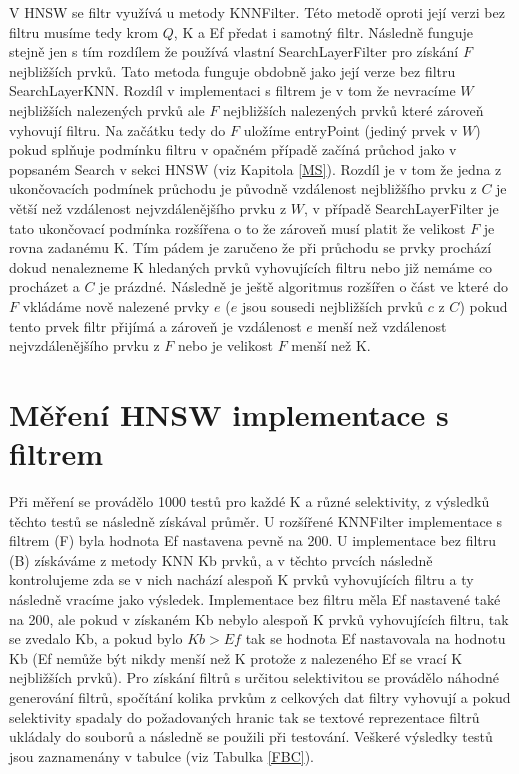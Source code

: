 \documentclass[czech,semestral,dept460,male,csharp,cpdeclaration]{diploma}
\begin{document}
		V HNSW se filtr využívá u metody KNNFilter. Této metodě oproti její verzi bez filtru musíme tedy krom $Q$, K a Ef předat i samotný filtr. Následně funguje stejně jen s tím rozdílem že používá vlastní SearchLayerFilter pro získání $F$ nejbližších prvků. Tato metoda funguje obdobně jako její verze bez filtru SearchLayerKNN. Rozdíl v implementaci s filtrem je v tom že nevracíme $W$ nejbližších nalezených prvků ale $F$ nejbližších nalezených prvků které zároveň vyhovují filtru. Na začátku tedy do $F$ uložíme entryPoint (jediný prvek v $W$) pokud splňuje podmínku filtru v opačném případě začíná průchod jako v popsaném Search v sekci HNSW (viz Kapitola \ref{MS}). Rozdíl je v tom že jedna z ukončovacích podmínek průchodu je původně vzdálenost nejbližšího prvku z $C$ je větší než vzdálenost nejvzdálenějšího prvku z $W$, v případě SearchLayerFilter je tato ukončovací podmínka rozšířena o to že zároveň musí platit že velikost $F$ je rovna zadanému K. Tím pádem je zaručeno že při průchodu se prvky prochází dokud nenalezneme K hledaných prvků vyhovujících filtru nebo již nemáme co procházet a $C$ je prázdné. Následně je ještě algoritmus rozšířen o část ve které do $F$ vkládáme nově nalezené prvky $e$ ($e$ jsou sousedi nejbližších prvků $c$ z $C$) pokud tento prvek filtr přijímá a zároveň je vzdálenost $e$ menší než vzdálenost nejvzdálenějšího prvku z $F$ nebo je velikost $F$ menší než K.
		
		\section{Měření HNSW implementace s filtrem}
		
		Při měření se provádělo 1000 testů pro každé K a různé selektivity, z výsledků těchto testů se následně získával průměr. U rozšířené KNNFilter implementace s filtrem (F) byla hodnota Ef nastavena pevně na 200. U implementace bez filtru (B) získáváme z metody KNN Kb prvků, a v těchto prvcích následně kontrolujeme zda se v nich nachází alespoň K prvků vyhovujících filtru a ty následně vracíme jako výsledek. Implementace bez filtru měla Ef nastavené také na 200, ale pokud v získaném Kb nebylo alespoň K prvků vyhovujících filtru, tak se zvedalo Kb, a pokud bylo $Kb > Ef$ tak se hodnota Ef nastavovala na hodnotu Kb (Ef nemůže být nikdy menší než K protože z nalezeného Ef se vrací K nejbližších prvků). Pro získání filtrů s určitou selektivitou se provádělo náhodné generování filtrů, spočítání kolika prvkům z celkových dat filtry vyhovují a pokud selektivity spadaly do požadovaných hranic tak se textové reprezentace filtrů ukládaly do souborů a následně se použili při testování. Veškeré výsledky testů jsou zaznamenány v tabulce (viz Tabulka \ref{FBC}).
		
\end{document}

